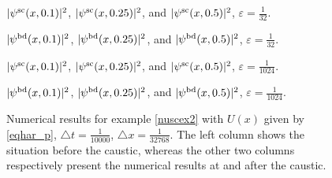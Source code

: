 \documentclass[leqno,final]{siamltex}
\numberwithin{equation}{section}
\newcounter{me}
\begin{document}
\begin{figure} \footnotesize
\begin{center}

$|\psi^{\rm sc}( x,0.1)|^2$, $|\psi^{\rm sc}( x,0.25)|^2$, and
$|\psi^{\rm sc}( x,0.5)|^2$, ${{\varepsilon }}={\frac{{1}}{{32}}}$.\vspace{4mm}


$|\psi^{\rm bd}( x,0.1)|^2$, $|\psi^{\rm bd}( x,0.25)|^2$, and
$|\psi^{\rm bd}( x,0.5)|^2$, ${{\varepsilon }}={\frac{{1}}{{32}}}$.\vspace{4mm}


$|\psi^{\rm sc}( x,0.1)|^2$, $|\psi^{\rm sc}( x,0.25)|^2$, and
$|\psi^{\rm sc}( x,0.5)|^2$, ${{\varepsilon }}={\frac{{1}}{{1024}}}$.\vspace{4mm}


$|\psi^{\rm bd}( x,0.1)|^2$, $|\psi^{\rm bd}( x,0.25)|^2$, and
$|\psi^{\rm bd}( x,0.5)|^2$, ${{\varepsilon }}={\frac{{1}}{{1024}}}$.
\end{center}
\caption{Numerical results for example \ref{nuscex2} with $U(x)$
given by \eqref{eqhar_p}, ${\triangle} t={\frac{{1}}{{10000}}}$, ${\triangle}
x={\frac{{1}}{{32768}}}$. The left column shows the situation before the
caustic, whereas the other two columns respectively present the
numerical results at and after the caustic.}\label{fig41}
\end{figure}
\end{document}
